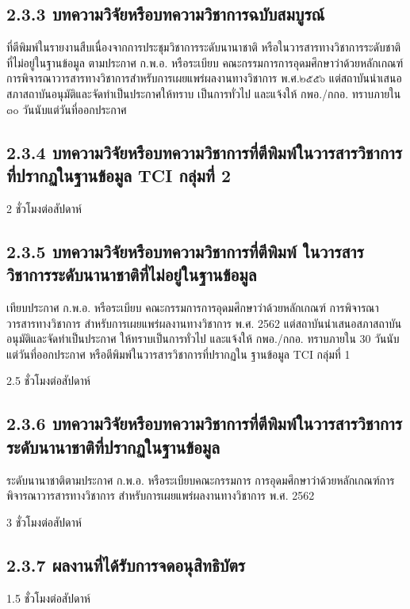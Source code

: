 \documentclass[a4paper,12pt,english]{sphinxmanual}
\begin{document}
\subsection{2.3.3 บทความวิจัยหรือบทความวิชาการฉบับสมบูรณ์}
\label{\detokenize{2research:id14}}
ที่ตีพิมพ์ในรายงานสืบเนื่องจากการประชุมวิชาการระดับนานาชาติ หรือในวารสารทางวิชาการระดับชาติที่ไม่อยู่ในฐานข้อมูล ตามประกาศ ก.พ.อ. หรือระเบียบ คณะกรรมการการอุดมศึกษาว่าด้วยหลักเกณฑ์การพิจารณาวารสารทางวิชาการสำหรับการเผยแพร่ผลงานทางวิชาการ พ.ศ.๒๕๕๖ แต่สถาบันนำเสนอสภาสถาบันอนุมัติและจัดทำเป็นประกาศให้ทราบ เป็นการทั่วไป และแจ้งให้ กพอ./กกอ. ทราบภายใน ๓๐ วันนับแต่วันที่ออกประกาศ


\subsection{2.3.4 บทความวิจัยหรือบทความวิชาการที่ตีพิมพ์ในวารสารวิชาการที่ปรากฏในฐานข้อมูล TCI กลุ่มที่ 2}
\label{\detokenize{2research:tci-2}}
2 ชั่วโมงต่อสัปดาห์


\subsection{2.3.5 บทความวิจัยหรือบทความวิชาการที่ตีพิมพ์ ในวารสารวิชาการระดับนานาชาติที่ไม่อยู่ในฐานข้อมูล}
\label{\detokenize{2research:id15}}
เทียบประกาศ ก.พ.อ. หรือระเบียบ คณะกรรมการการอุดมศึกษาว่าด้วยหลักเกณฑ์ การพิจารณาวารสารทางวิชาการ สำหรับการเผยแพร่ผลงานทางวิชาการ พ.ศ. 2562 แต่สถาบันนำเสนอสภาสถาบันอนุมัติและจัดทำเป็นประกาศ ให้ทราบเป็นการทั่วไป และแจ้งให้ กพอ./กกอ. ทราบภายใน 30 วันนับแต่วันที่ออกประกาศ หรือตีพิมพ์ในวารสารวิชาการที่ปรากฏใน ฐานข้อมูล TCI กลุ่มที่ 1

2.5 ชั่วโมงต่อสัปดาห์


\subsection{2.3.6 บทความวิจัยหรือบทความวิชาการที่ตีพิมพ์ในวารสารวิชาการระดับนานาชาติที่ปรากฏในฐานข้อมูล}
\label{\detokenize{2research:id16}}
ระดับนานาชาติตามประกาศ ก.พ.อ. หรือระเบียบคณะกรรมการ การอุดมศึกษาว่าด้วยหลักเกณฑ์การพิจารณาวารสารทางวิชาการ สำหรับการเผยแพร่ผลงานทางวิชาการ พ.ศ. 2562

3 ชั่วโมงต่อสัปดาห์


\subsection{2.3.7 ผลงานที่ได้รับการจดอนุสิทธิบัตร}
\label{\detokenize{2research:id17}}
1.5 ชั่วโมงต่อสัปดาห์
\end{document}
